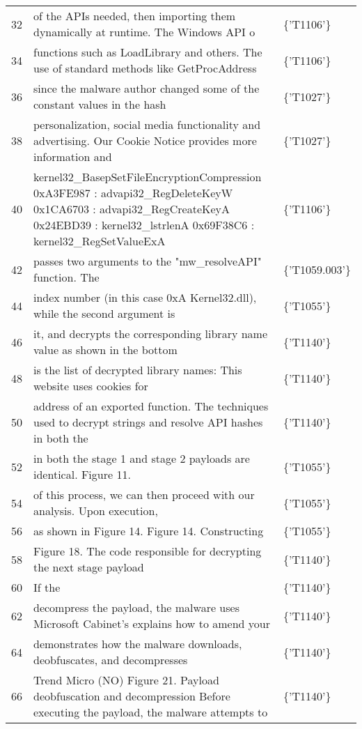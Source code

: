 \begin{tabular}{rll}
32 & of the APIs needed, then importing them dynamically at runtime. The Windows API o & \{'T1106'\} \\
34 & functions such as LoadLibrary and others. The use of standard methods like GetProcAddress & \{'T1106'\} \\
36 & since the malware author changed some of the constant values in the hash & \{'T1027'\} \\
38 & personalization, social media functionality and advertising. Our Cookie Notice provides more information and & \{'T1027'\} \\
40 & kernel32\_BasepSetFileEncryptionCompression 0xA3FE987 : advapi32\_RegDeleteKeyW 0x1CA6703 : advapi32\_RegCreateKeyA 0x24EBD39 : kernel32\_lstrlenA 0x69F38C6 : kernel32\_RegSetValueExA & \{'T1106'\} \\
42 & passes two arguments to the "mw\_resolveAPI" function. The  & \{'T1059.003'\} \\
44 & index number (in this case 0xA   Kernel32.dll), while the second argument is & \{'T1055'\} \\
46 & it, and decrypts the corresponding library name value as shown in the bottom & \{'T1140'\} \\
48 & is the list of decrypted library names:   This website uses cookies for & \{'T1140'\} \\
50 & address of an exported function. The techniques used to decrypt strings and resolve API hashes in both the & \{'T1140'\} \\
52 & in both the stage 1 and stage 2 payloads are identical. Figure 11. & \{'T1055'\} \\
54 & of this process, we can then proceed with our analysis.   Upon execution, & \{'T1055'\} \\
56 & as shown in Figure 14. Figure 14. Constructing  & \{'T1055'\} \\
58 & Figure 18. The code responsible for decrypting the next stage payload  & \{'T1140'\} \\
60 & If the  & \{'T1140'\} \\
62 & decompress the payload, the malware uses Microsoft Cabinet's explains how to amend your & \{'T1140'\} \\
64 & demonstrates how the malware downloads, deobfuscates, and decompresses  & \{'T1140'\} \\
66 &   Trend Micro (NO) Figure 21. Payload deobfuscation and decompression Before executing the payload, the malware attempts to & \{'T1140'\} \\

\end{tabular}
